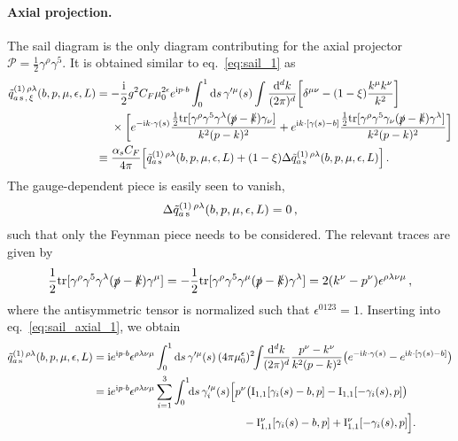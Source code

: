 \documentclass[11pt,a4paper]{article}
\DeclareRobustCommand{\eq}[1]{eq.~\eqref{eq:#1}}
\newcommand{\df}{\mathrm{d}}
\newcommand{\img}{\mathrm{i}}
\newcommand{\eps}{\epsilon}
\newcommand{\cP}{\mathcal{P}}
\newcommand{\nn}{\nonumber}
\newcommand{\as}{\alpha_s}
\newcommand{\tr}{\mathrm{tr}}
\newcommand{\pb}{{p{\cdot}b}}
\newcommand{\MI}{\mathbf{\rm I}}
\begin{document}
\paragraph{Axial projection.}
The sail diagram is the only diagram contributing for the axial projector $\cP = \frac12 \gamma^\rho \gamma^5$.
It is obtained similar to \eq{sail_1} as
\begin{align} \label{eq:sail_axial_1}
 \tilde q^{(1)\,\rho\lambda}_{a\,{\rm s}\,,\,\xi}(b,p,\mu,\eps,L) &
 = -\frac{\img}{2} g^2 C_F \mu_0^{2\eps} e^{\img \pb} \int_0^1 \df s \, \gamma^{\prime\mu}(s)
   \int\frac{\df^d k}{(2\pi)^d} \biggl[ \delta^{\mu\nu} - (1-\xi) \frac{k^\mu k^\nu}{k^2} \biggr]
   \nn\\&~\quad \times \biggl[
    e^{- \img k \cdot \gamma(s)} \frac{\frac12 \tr[\gamma^\rho \gamma^5 \gamma^\lambda (\slashed{p}-\slashed{k}) \gamma_\nu]}{k^2 (p-k)^2}
  + e^{\img k \cdot [\gamma(s) - b]} \frac{\frac12 \tr[\gamma^\rho \gamma^5 \gamma_\nu (\slashed{p}-\slashed{k}) \gamma^\lambda]}{k^2 (p-k)^2}\biggr]
\nn\\&
 \equiv \frac{\as C_F}{4\pi} \Bigl[ \tilde q^{(1)\,\rho\lambda}_{a\,\rm s}(b,p,\mu,\eps,L) + (1-\xi) \Delta \tilde q^{(1)\,\rho\lambda}_{a\,\rm s}(b,p,\mu,\eps,L) \Bigr]
\,.\end{align}
The gauge-dependent piece is easily seen to vanish,
\begin{align} \label{eq:sail_axial_cov_final}
 \Delta \tilde q^{(1)\,\rho\lambda}_{a\,\rm s}(b,p,\mu,\eps,L) = 0
\,,\end{align}
such that only the Feynman piece needs to be considered.
The relevant traces are given by
\begin{align}
 \frac12 \tr[\gamma^\rho \gamma^5 \gamma^\lambda (\slashed{p}-\slashed{k}) \gamma^\mu]
 = - \frac12 \tr[\gamma^\rho \gamma^5 \gamma^\mu (\slashed{p}-\slashed{k}) \gamma^\lambda]
 = 2 (k^\nu - p^\nu) \eps^{\rho\lambda\nu\mu}
\,,\end{align}
where the antisymmetric tensor is normalized such that $\eps^{0123} = 1$.
Inserting into \eq{sail_axial_1}, we obtain
\begin{align} \label{eq:sail_axial_2}
 \tilde q^{(1)\,\rho\lambda}_{a\,\rm s}(b,p,\mu,\eps,L) &
 = \img e^{\img \pb} \eps^{\rho\lambda\nu\mu} \int_0^1 \df s \, \gamma^{\prime\mu}(s) \,
   (4\pi\mu_0^\eps)^2 \!\! \int\!\!\frac{\df^d k}{(2\pi)^d} \frac{p^\nu - k^\nu}{k^2 (p-k)^2}
   \big( e^{- \img k \cdot \gamma(s)} - e^{\img k \cdot [\gamma(s) - b]} \bigr)
\nn\\&
 = \img e^{\img \pb} \eps^{\rho\lambda\nu\mu} \sum_{i=1}^3 \int_0^1 \!\!\df s \, \gamma_i^{\prime\mu}(s)
   \Bigl[ p^\nu \bigl(\MI_{1,1}[\gamma_i(s)-b,p] - \MI_{1,1}[-\gamma_i(s),p]\bigr)
   \nn\\&\hspace{4.8cm}
         - \MI^\nu_{1,1}[\gamma_i(s)-b,p] + \MI^\nu_{1,1}[-\gamma_i(s),p] \Bigr]
.\end{align}
\end{document}
